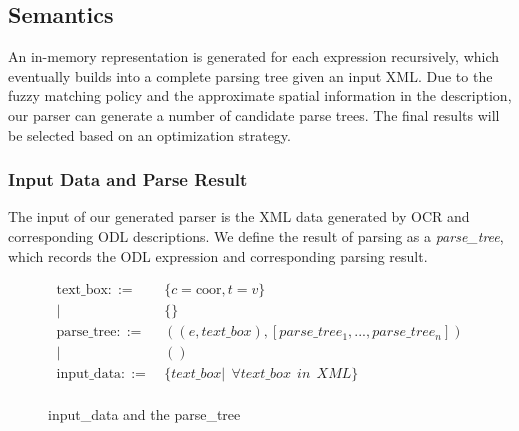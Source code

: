 \subsection{Semantics}
\label{sec:semantics}
An in-memory representation is generated for each expression recursively, 
which eventually builds into a complete parsing tree given an input XML.
Due to the fuzzy matching policy and the approximate spatial information
in the description, our parser can generate a number of candidate parse
trees.  The final results will be selected based on an optimization strategy.

\subsubsection{Input Data and Parse Result}
The input of our generated parser is the XML data generated by OCR  and corresponding ODL descriptions.  
We define the result of parsing as a {\em parse\_tree}, 
which records the ODL expression and corresponding parsing result.
\begin{figure}[ht!]
\tiny
\centering
\begin{align*}
		   \text{text\_box} ::=~&\{c=\text{coor}, t=v\}\\
		   |~& \{\}\\
		   \text{parse\_tree} ::=~&((e,text\_box), [parse\_tree_1,...,parse\_tree_n])\\
		   |~& ()\\
\text{input\_data} ::=~&\{text\_box | ~~ \forall text\_box ~~in ~~XML\}\\
\end{align*}
\caption{input\_data and the parse\_tree}
\label{fig:data}
\end{figure}

